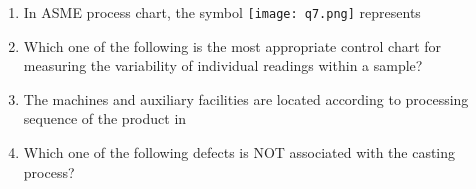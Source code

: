 \documentclass[journal,12pt,onecolumn]{IEEEtran}
\theoremstyle{remark}
\begin{document}
\begin{enumerate}
\item In ASME process chart, the symbol \texttt{[image: q7.png]} represents

\hfill{}

\begin{enumerate}
\end{enumerate}

\item Which one of the following is the most appropriate control chart for measuring the variability of individual readings within a sample?

\hfill{}

\begin{enumerate}
\end{enumerate}

\item The machines and auxiliary facilities are located according to processing sequence of the product in

\hfill{}

\begin{enumerate}
\end{enumerate}

\item Which one of the following defects is NOT associated with the casting process?

\hfill{}


\end{enumerate}
\end{document}
